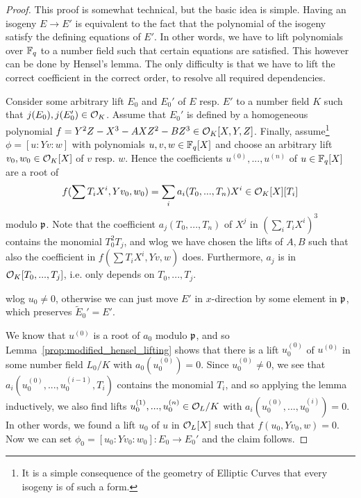 \begin{proof}
    This proof is somewhat technical, but the basic idea is simple.
    Having an isogeny $E \to E'$ is equivalent to the fact that the polynomial of the isogeny satisfy the defining equations of $E'$.
    In other words, we have to lift polynomials over $\mathbb{F}_q$ to a number field such that certain equations are satisfied.
    This however can be done by Hensel's lemma.
    The only difficulty is that we have to lift the correct coefficient in the correct order, to resolve all required dependencies.

    Consider some arbitrary lift $E_0$ and $E_0'$ of $E$ resp. $E'$ to a number field $K$ such that $j(E_0), j(E_0') \in \mathcal{O}_K$.
    Assume that $E_0'$ is defined by a homogeneous polynomial $f = Y^2Z - X^3 - AXZ^2 - BZ^3 \in \mathcal{O}_K[X, Y, Z]$.
    Finally, assume\footnote{It is a simple consequence of the geometry of Elliptic Curves that every isogeny is of such a form.} $\phi = [u : Y v : w]$ with polynomials $u, v, w \in \mathbb{F}_q[X]$ and choose an arbitrary lift $v_0, w_0 \in \mathcal{O}_K[X]$ of $v$ resp. $w$.
    Hence the coefficients $u^{(0)}, ..., u^{(n)}$ of $u \in \mathbb{F}_q[X]$ are a root of
    \begin{equation*}
        f(\sum T_i X^i, Y v_0, w_0) = \sum_i a_i(T_0, ..., T_n) X^i \in \mathcal{O}_K[X][T_i]
    \end{equation*}
    modulo $\mathfrak{p}$.
    Note that the coefficient $a_j(T_0, ..., T_n)$ of $X^j$ in $(\sum_i T_i X^i)^3$ contains the monomial $T_0^2 T_j$, and 
    wlog we have chosen the lifts of $A, B$ such that also the coefficient in $f(\sum T_i X^i, Y v, w)$ does.
    Furthermore, $a_j$ is in $\mathcal{O}_K[T_0, ..., T_j]$, i.e. only depends on $T_0, ..., T_j$.

    wlog $u_0 \neq 0$, otherwise we can just move $E'$ in $x$-direction by some element in $\mathfrak{p}$, which preserves $\tilde{E}_0' = E'$.

    We know that $u^{(0)}$ is a root of $a_0$ modulo $\mathfrak{p}$, and so Lemma~\ref{prop:modified_hensel_lifting} shows that there is a lift $u^{(0)}_0$ of $u^{(0)}$ in some number field $L_0/K$ with $a_0(u^{(0)}_0) = 0$.
    Since $u_0^{(0)} \neq 0$, we see that $a_i(u_0^{(0)}, ..., u_0^{(i - 1)}, T_i)$ contains the monomial $T_i$, and so applying the lemma inductively, we also find lifts $u^{(1)}_0, ..., u^{(n)}_0 \in \mathcal{O}_L/K$ with $a_i(u^{(0)}_0, ..., u^{(i)}_0) = 0$.
    In other words, we found a lift $u_0$ of $u$ in $\mathcal{O}_L[X]$ such that $f(u_0, Y v_0, w) = 0$.
    Now we can set $\phi_0 = [u_0 : Y v_0 : w_0]: E_0 \to E_0'$ and the claim follows.
\end{proof}
